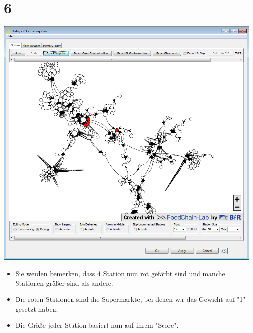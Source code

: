 \documentclass{beamer}
\begin{document}
\section{6}
\begin{frame}
	\begin{center}
  		\includegraphics[height=0.6\textheight]{6.png}
	\end{center}
	\begin{itemize}
		\item Sie werden bemerken, dass 4 Station nun rot gefärbt sind und manche Stationen größer sind als andere.
		\item Die roten Stationen sind die Supermärkte, bei denen wir das Gewicht auf "1" gesetzt haben.
		\item Die Größe jeder Station basiert nun auf ihrem "Score".
	\end{itemize}
\end{frame}
\end{document}
